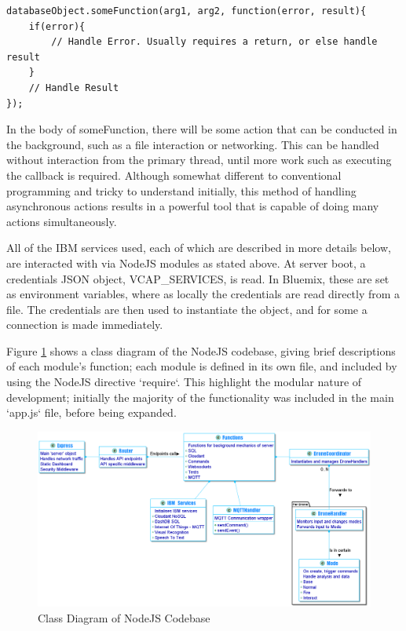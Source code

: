 \documentclass{article}
\begin{document}
\begin{lstlisting}
databaseObject.someFunction(arg1, arg2, function(error, result){
	if(error){
		// Handle Error. Usually requires a return, or else handle result
	}
	// Handle Result
});

\end{lstlisting}  

In the body of someFunction, there will be some action that can be conducted in the background, such as a file interaction or networking. This can be handled without interaction from the primary thread, until more work such as executing the callback is required. Although somewhat different to conventional programming and tricky to understand initially, this method of handling asynchronous actions results in a powerful tool that is capable of doing many actions simultaneously. 

All of the IBM services used, each of which are described in more details below, are interacted with via NodeJS modules as stated above. At server boot, a credentials JSON object, VCAP\_SERVICES, is read. In Bluemix, these are set as environment variables, where as locally the credentials are read directly from a file. The credentials are then used to instantiate the object, and for some a connection is made immediately.

Figure \ref{fig:ServerDiagram} shows a class diagram of the NodeJS codebase, giving brief descriptions of each module's function; each module is defined in its own file, and included by using the NodeJS directive `require`. This highlight the modular nature of development; initially the majority of the functionality was included in the main `app.js` file, before being expanded. 

\begin{landscape}
\begin{figure}
\centering
\caption{Class Diagram of NodeJS Codebase\label{fig:ServerDiagram}}
\includegraphics[width=1.5\textheight]{ServerDiagram}
\end{figure}
\end{landscape}
\end{document}
